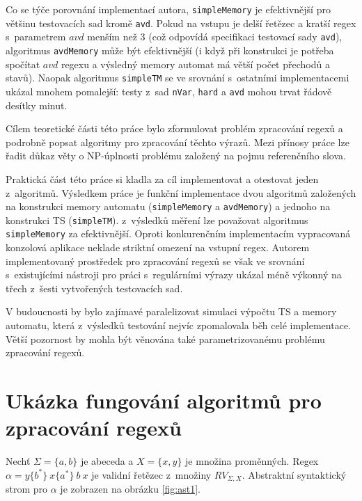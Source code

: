 \documentclass[thesis=B,czech]{FITthesis}[2019/12/23]
\theoremstyle{definition}
\begin{document}
Co se týče porovnání implementací autora, \texttt{simpleMemory} je efektivnější pro většinu testovacích sad kromě \texttt{avd}. Pokud na vstupu je delší řetězec a kratší regex s~parametrem $avd$ menším než 3 (což odpovídá specifikaci testovací sady \texttt{avd}), algoritmus \texttt{avdMemory} může být efektivnější (i když při konstrukci je potřeba spočítat $avd$ regexu a výsledný memory automat má větší počet přechodů a stavů). Naopak algoritmus \texttt{simpleTM} se ve srovnání s~ostatními implementacemi ukázal mnohem pomalejší: testy z~sad \texttt{nVar}, \texttt{hard} a \texttt{avd} mohou trvat řádově desítky minut.

\begin{conclusion}
Cílem teoretické části této práce bylo zformulovat problém zpracování regexů a podrobně popsat algoritmy pro zpracování těchto výrazů.  
Mezi přínosy práce lze řadit důkaz věty o NP-úplnosti problému založený na pojmu referenčního slova.

Praktická část této práce si kladla za cíl implementovat a otestovat jeden z~algoritmů. Výsledkem práce je funkční implementace dvou algoritmů založených na konstrukci memory automatu (\texttt{simpleMemory} a \texttt{avdMemory}) a jednoho na konstrukci TS (\texttt{simpleTM}). z~výsledků měření lze považovat algoritmus \texttt{simpleMemory} za efektivnější. Oproti konkurenčním implementacím vypracovaná konzolová aplikace neklade striktní omezení na vstupní regex.  Autorem implementovaný prostředek pro zpracování regexů se však ve srovnání s~existujícími nástroji pro práci s~regulárními výrazy ukázal méně výkonný na třech z~šesti vytvořených testovacích sad.

V budoucnosti by bylo zajímavé paralelizovat simulaci výpočtu TS a memory automatu, která z~výsledků testování nejvíc zpomalovala běh celé implementace. Větší pozornost by mohla být věnována také parametrizovanému problému zpracování regexů.  

\end{conclusion}




\appendix

\chapter{Ukázka fungování algoritmů pro zpracování regexů}
Nechť $\Sigma = \{a, b\}$ je abeceda a $X = \{x, y\}$ je množina proměnných. Regex $\alpha = y\{b^\ast\} \ x\{a^\ast\} \ b \ x$ je validní řetězec z~množiny $RV_{\Sigma, X}$. Abstraktní syntaktický strom pro $\alpha$ je zobrazen na obrázku \ref{fig:ast1}.
\end{document}
